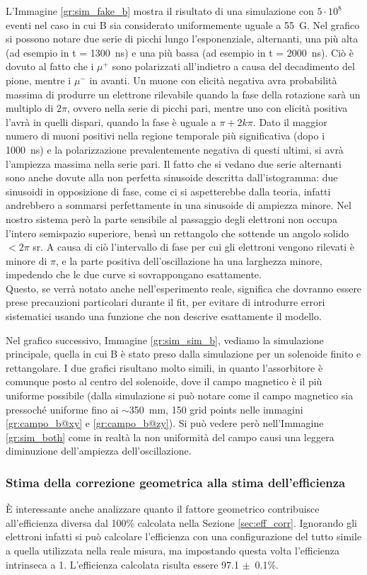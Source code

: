 L'Immagine \ref{gr:sim_fake_b} mostra il risultato di una simulazione con $5\cdot 10^8$ eventi nel caso in cui B sia considerato uniformemente uguale a 55~G. Nel grafico si possono notare due serie di picchi lungo l'esponenziale, alternanti, una più alta (ad esempio in t = 1300~ns) e una più bassa (ad esempio in t = 2000~ns). Ci\`o \`e dovuto al fatto che i $\mu^+$ sono polarizzati all'indietro a causa del decadimento del pione, mentre i $\mu^-$ in avanti. Un muone con elicit\`a negativa avra probabilit\`a massima di produrre un elettrone rilevabile quando la fase della rotazione sar\`a un multiplo di $2\pi$, ovvero nella serie di picchi pari, mentre uno con elicit\`a positiva l'avr\`a in quelli dispari, quando la fase \`e uguale a $\pi+2k\pi$. Dato il maggior numero di muoni positivi nella regione temporale pi\`u significativa (dopo i 1000~ns) e la polarizzazione prevalentemente negativa di questi ultimi, si avr\`a l'ampiezza massima nella serie pari. Il fatto che si vedano due serie alternanti sono anche dovute alla non perfetta sinusoide descritta dall'istogramma: due sinusoidi in opposizione di fase, come ci si aspetterebbe dalla teoria, infatti andrebbero a sommarsi perfettamente in una sinusoide di ampiezza minore. Nel nostro sistema per\`o la parte sensibile al passaggio degli elettroni non occupa l'intero semispazio superiore, bens\`i un rettangolo che sottende un angolo solido $<2\pi$ sr. A causa di ci\`o l'intervallo di fase per cui gli elettroni vengono rilevati \`e minore di $\pi$, e la parte positiva dell'oscillazione ha una larghezza minore, impedendo che le due curve si sovrappongano esattamente.\\
Questo, se verr\`a notato anche nell'esperimento reale, significa che dovranno essere prese precauzioni particolari durante il fit, per evitare di introdurre errori sistematici usando una funzione che non descrive esattamente il modello. 

Nel grafico successivo, Immagine \ref{gr:sim_sim_b}, vediamo la simulazione principale, quella in cui B \`e stato preso dalla simulazione per un solenoide finito e rettangolare. I due grafici risultano molto simili, in quanto l'assorbitore \`e comunque posto al centro del solenoide, dove il campo magnetico \`e il pi\`u uniforme possibile (dalla simulazione si pu\`o notare come il campo magnetico sia pressoch\'e uniforme fino ai $\sim$350~mm, 150 grid points nelle immagini \ref{gr:campo_b@xy} e \ref{gr:campo_b@zy}). Si pu\`o vedere per\`o nell'Immagine \ref{gr:sim_both} come in realt\`a la non uniformit\`a del campo causi una leggera diminuzione dell'ampiezza dell'oscillazione.

\subsubsection{Stima della correzione geometrica alla stima dell'efficienza}
\`E interessante anche analizzare quanto il fattore geometrico contribuisce all'efficienza diversa dal 100\% calcolata nella Sezione \ref{sec:eff_corr}. Ignorando gli elettroni infatti si pu\`o calcolare l'efficienza con una configurazione del tutto simile a quella utilizzata nella reale misura, ma impostando questa volta l'efficienza intrinseca a 1. L'efficienza calcolata risulta essere 97.1 $\pm$~0.1\%.
